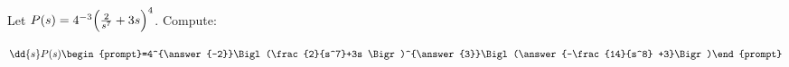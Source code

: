 \documentclass{ximera}
\author{Bart Snapp\and Nela lakos}
\begin{document}
\begin{exercise}
Let $P(s) =4^{-3}\Bigl(\frac{2}{s^7}+3s \Bigr)^{4}$. Compute:

\[
\dd{s}P(s)
\begin{prompt}=4^{\answer{-2}}\Bigl(\frac{2}{s^7}+3s \Bigr)^{\answer{3}}\Bigl(\answer{-\frac{14}{s^8} +3}\Bigr)\end{prompt}
\]
\end{exercise}
\end{document}
